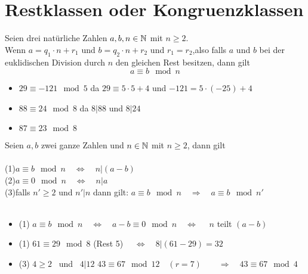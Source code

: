 	\section{Restklassen oder Kongruenzklassen}

\begin{Definition}
Seien drei natürliche Zahlen $a, b, n \in \mathbb{N}$ mit $n\geq 2$.\\ Wenn $a=q_{1} \cdot n + r_{1}$  \qquad und \qquad  $b=q_{2} \cdot n + r_{2}$ \qquad und \quad $r_{1}=r_{2}$,\qquad also falls $a$ und $b$ bei der euklidischen Division durch $n$ den gleichen Rest besitzen, dann gilt
$$a \equiv b\mod n$$
\end{Definition}

\begin{Beispiel}
\begin{itemize}
\item $29\equiv-121 \mod 5 $ \quad da $29 \equiv 5\cdot 5 +4$ \quad und \quad $-121 = 5\cdot (-25) +4$ 
\item $88\equiv 24 \mod 8 $ \quad da $8|88$ \quad und \quad $8|24$
\item $87\equiv 23 \mod 8$ \\
\end{itemize}
\end{Beispiel}

\begin{Theorem}
Seien $a,b$ zwei ganze Zahlen und $n\in\mathbb{N}$ mit $n\geq 2$, dann gilt\\\\
(1)\qquad $ a\equiv b \mod n \quad \Leftrightarrow \quad n|(a-b)$\\
(2)\qquad $ a\equiv 0 \mod n \quad\Leftrightarrow\quad n|a$\\
(3)\qquad falls $n'\geq 2$ und $n'|n$ dann gilt: \quad $a \equiv b \mod n \quad \Rightarrow \quad a \equiv b \mod n' $\\\\
\end{Theorem}

\begin{Beweis}
\begin{itemize}
\item (1) \quad $ a \equiv b \mod n \quad\Leftrightarrow\quad a - b \equiv 0 \mod n \quad\Leftrightarrow\quad $ $n$ teilt $(a-b)$ 
\end{itemize}
\end{Beweis}

\begin{Beispiel}
\begin{itemize}
\item (1) \quad $61 \equiv 29 \mod 8$ \quad (Rest 5) $\quad\Leftrightarrow\quad 8| (61-29) = 32 $ 
\item (3) \quad $4 \geq 2$ \, und \, $4|12$ \quad $43 \equiv 67 \mod 12 \quad(r=7)\qquad \Rightarrow \quad 43 \equiv 67 \mod 4  $ \\
\end{itemize}
\end{Beispiel}


